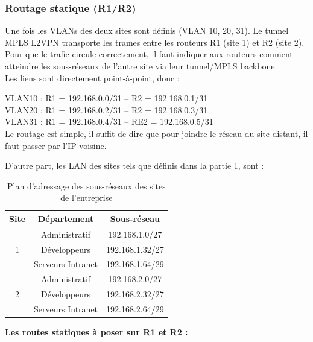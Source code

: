 \documentclass[12pt,a4paper, oneside]{memoir}
\begin{document}
		\subsubsection{Routage statique (R1/R2)}

Une fois les VLANs des deux sites sont définis (VLAN 10, 20, 31).
Le tunnel MPLS L2VPN transporte les trames entre les routeurs R1 (site 1) et R2 (site 2).
Pour que le trafic circule correctement, il faut indiquer aux routeurs comment atteindre les sous-réseaux de l’autre site via leur tunnel/MPLS backbone.\\
Les liens sont directement point-à-point, donc : 

VLAN10 : R1 = 192.168.0.0/31 -- R2 = 192.168.0.1/31\\
VLAN20 : R1 = 192.168.0.2/31 -- R2 = 192.168.0.3/31\\
VLAN31 : R1 = 192.168.0.4/31 -- RE2 = 192.168.0.5/31\\

Le routage est simple, il suffit de dire que pour joindre le réseau du site distant, il faut passer par l’IP voisine. 

D'autre part, les LAN des sites tels que définis dans la partie 1, sont :\\
\begin{table}[H]
	\centering
	\begin{tabular}{|c|c|c|}
		\hline
		\textbf{Site} & \textbf{Département} & \textbf{Sous-réseau} \\
		\hline
		 & Administratif & 192.168.1.0/27 \\
		 1 & Développeurs  & 192.168.1.32/27 \\
		 & Serveurs Intranet & 192.168.1.64/29 \\
		\hline
		\hline
		& Administratif & 192.168.2.0/27 \\
		2 & Développeurs  & 192.168.2.32/27 \\
		& Serveurs Intranet & 192.168.2.64/29 \\
		\hline
	\end{tabular}
	\caption{Plan d’adressage des sous-réseaux des sites de l’entreprise}
	\label{tab:adressage_sites}
\end{table}

\textbf{Les routes statiques à poser sur R1 et R2 :}

\end{document}
